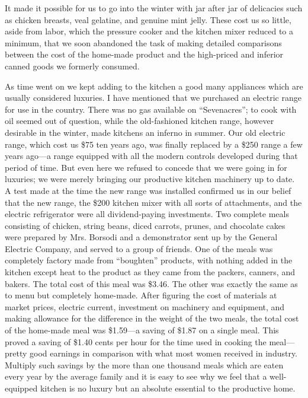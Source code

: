 \documentclass{book}
\begin{document}
It made it possible for us to go into the winter with jar after jar of delicacies such as chicken breasts, veal gelatine, and genuine mint jelly. These cost us so little, aside from labor, which the pressure cooker and the kitchen mixer reduced to a minimum, that we soon abandoned the task of making detailed comparisons between the cost of the home-made product and the high-priced and inferior canned goods we formerly consumed.

As time went on we kept adding to the kitchen a good many appliances which are usually considered luxuries. I have mentioned that we purchased an electric range for use in the country. There was no gas available on “Sevenacres”; to cook with oil seemed out of question, while the old-fashioned kitchen range, however desirable in the winter, made kitchens an inferno in summer. Our old electric range, which cost us \$75 ten years ago, was finally replaced by a \$250 range a few years ago—a range equipped with all the modern controls developed during that period of time. But even here we refused to concede that we were going in for luxuries; we were merely bringing our productive kitchen machinery up to date. A test made at the time the new range was installed confirmed us in our belief that the new range, the \$200 kitchen mixer with all sorts of attachments, and the electric refrigerator were all dividend-paying investments. Two complete meals consisting of chicken, string beans, diced carrots, prunes, and chocolate cakes were prepared by Mrs. Borsodi and a demonstrator sent up by the General Electric Company, and served to a group of friends. One of the meals was completely factory made from “boughten” products, with nothing added in the kitchen except heat to the product as they came from the packers, canners, and bakers. The total cost of this meal was \$3.46. The other was exactly the same as to menu but completely home-made. After figuring the cost of materials at market prices, electric current, investment on machinery and equipment, and making allowance for the difference in the weight of the two meals, the total cost of the home-made meal was \$1.59—a saving of \$1.87 on a single meal. This proved a saving of \$1.40 cents per hour for the time used in cooking the meal—pretty good earnings in comparison with what most women received in industry. Multiply such savings by the more than one thousand meals which are eaten every year by the average family and it is easy to see why we feel that a well-equipped kitchen is no luxury but an absolute essential to the productive home.
\end{document}
